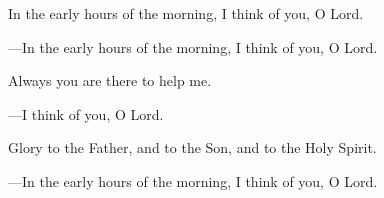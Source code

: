 \responsory
\begin{hangpar}

In the early hours of the morning, I think of you, O Lord.

{\color{red}---\thinspace}In the early hours of the morning, I think of you, O Lord.

\medskip Always you are there to help me.

{\color{red}---\thinspace}I think of you, O Lord.

\medskip Glory to the Father, and to the Son, and to the Holy Spirit.

{\color{red}---\thinspace}In the early hours of the morning, I think of you, O Lord.
\end{hangpar}
